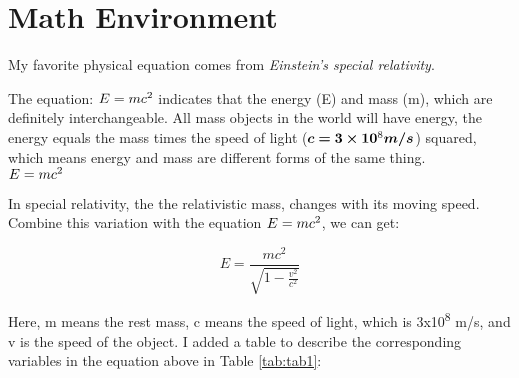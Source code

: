 \documentclass[12pt, letterpaper]{article} %
\begin{document}
\section{Math Environment} %
My favorite physical equation comes from  \textit{Einstein's special relativity}. 

The equation: $E = mc\textsuperscript{2}$ indicates that the energy (E) and mass (m), 
which are definitely interchangeable. All mass objects in the world will have energy, 
the energy equals the mass times the speed of light ($\bm{c = 3\times10\textsuperscript{8} m/s}$) 
squared, which means energy and mass are different forms of the same thing. \\ %

\begin{math}  %
  E = {mc}\textsuperscript{2} %
\end{math} %

In special relativity, the the relativistic mass, changes with its moving speed. 
Combine this variation with the equation $E = mc\textsuperscript{2}$, we can get: 

\begin{equation} 
  E = \frac{mc^2}{\sqrt{1-\frac{v^2}{c^2}}}
  \label{eq:1}  
\end{equation} %

Here, m means the rest mass, c means the speed of light, which is 3x10\textsuperscript{8} m/s, and v is the speed 
of the object. I added a table to describe the corresponding variables in the equation above in 
Table \ref{tab:tab1}: %
\end{document}
